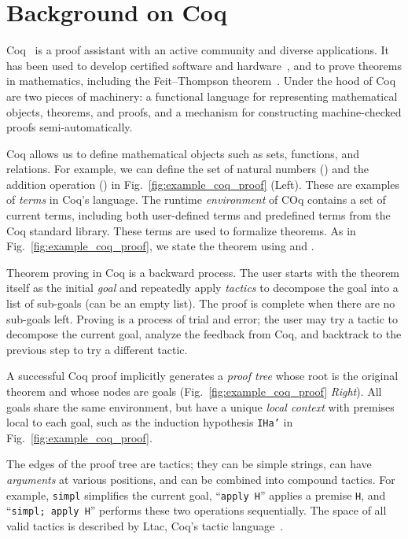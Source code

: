 \documentclass{article}
\begin{document}
\section{Background on Coq}


Coq~\citep{barras1997coq} is a proof assistant with an active community and diverse applications.
It has been used to develop certified software and hardware~\citep{leroy2009formal, paulin1995circuits}, and to prove theorems in mathematics, including the Feit--Thompson theorem~\citep{gonthier2013machine}.
Under the hood of Coq are two pieces of machinery: 
 a functional language for representing mathematical objects, theorems, and proofs, and 
a mechanism for constructing machine-checked proofs semi-automatically.

Coq allows us to define mathematical objects such as sets, functions, and relations. 
For example, we can define the set of natural numbers () and the addition operation () in Fig.~\ref{fig:example_coq_proof} (Left).
These are examples of \textit{terms} in Coq's language.
The runtime \textit{environment} of COq contains a set of current terms, including both user-defined terms and predefined terms from the Coq standard library.
These terms are used to formalize theorems.
As in Fig.~\ref{fig:example_coq_proof}, we state the theorem  using  and .

Theorem proving in Coq is a backward process.
The user starts with the theorem itself as the initial \textit{goal} and repeatedly apply \textit{tactics} to 
decompose the goal into a list of sub-goals (can be an empty list).
The proof is complete when there are no sub-goals left.
Proving is a process of trial and error; the user may try a tactic to decompose the current goal, analyze the feedback from Coq, and backtrack to the previous step to try a different tactic.

A successful Coq proof implicitly generates a \textit{proof tree} whose root is the original theorem and whose nodes are goals (Fig.~\ref{fig:example_coq_proof} \textit{Right}).
All goals share the same environment, but have a unique \textit{local context} with premises local to each goal, such as the induction hypothesis \texttt{IHa'} in Fig.~\ref{fig:example_coq_proof}.


The edges of the proof tree are tactics; they can be simple strings, can have \textit{arguments} at various positions, and can be combined into compound tactics.
For example, \texttt{simpl} simplifies the current goal, ``\texttt{apply H}'' applies a premise \texttt{H}, and ``\texttt{simpl; apply H}'' performs these two operations sequentially.
The space of all valid tactics is described by Ltac, Coq's tactic language~\citep{delahaye2000tactic}.
\end{document}
